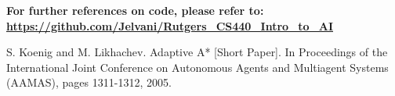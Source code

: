 \documentclass[pdftex,10pt,a4paper,oneside]{article}
\numberwithin{equation}{section} %
\begin{document}

\textbf{
For further references on code, please refer to:
\linebreak
\url{https://github.com/Jelvani/Rutgers_CS440_Intro_to_AI}
}











\begin{thebibliography}{1}
S. Koenig and M. Likhachev. Adaptive A* [Short Paper]. In Proceedings of the International Joint Conference on Autonomous Agents and Multiagent Systems (AAMAS), pages 1311-1312, 2005.

\end{thebibliography}
\end{document}
